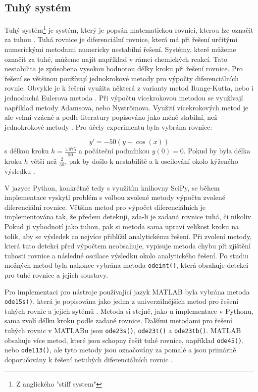 \subsection{Tuhý systém}
\label{tuhy}
Tuhý systém\footnote{Z anglického "stiff system"} je systém, který je popsán matematickou rovnicí, kterou lze označit za tuhou \cite{hairer}. Tuhá rovnice je diferenciální rovnice, která má při řešení určitými numerickými metodami numericky nestabilní řešení. Systémy, které můžeme označit za tuhé, můžeme najít například v rámci chemických reakcí. Tato nestabilita je způsobena vysokou hodnotou délky kroku při řešení rovnice. Pro řešení se většinou používají jednokrokové metody pro výpočty diferenciálních rovnic. Obvykle je k řešení využita některá z varianty metod Runge-Kutta, nebo i jednoduchá Eulerova metoda \cite{IMS-skripta}. Při výpočtu vícekrokovou metodou se využívají například metody Adamsova, nebo Nyströmova. Využití vícekrokových metod je ale velmi vzácné a podle literatury popisováno jako méně stabilní, než jednokrokové metody \cite{hairer}. Pro účely experimentu byla vybrána rovnice:

\begin{equation}
    y' = -50(y - \cos{(x)})
\end{equation}
s délkou kroku $h = \frac{1.875}{50}$ a počáteční podmínkou $y(0) = 0$. Pokud by byla délka kroku $h$ větší než $\frac{2}{50}$, pak by došlo k nestabilitě a k oscilování okolo kýženého výsledku \cite{hairer}.

V jazyce Python, konkrétně tedy s využitím knihovny SciPy, se během implementace vyskytl problém s volbou zvolené metody výpočtu zvolené diferenciální rovnice. Většina metod pro výpočet diferenciálních je implementována tak, že předem detekují, zda-li je zadaná rovnice tuhá, či nikoliv. Pokud ji vyhodnotí jako tuhou, pak si metoda sama upraví velikost kroku na tolik, aby se výsledek co nejvíce přiblížil analytickému řešení. Při zvolení metody, která tuto detekci před výpočtem neobsahuje, vypisuje metoda chybu při zjištění tuhosti rovnice a následné oscilace výsledku okolo analytického řešení. Po studiu možných metod byla nakonec vybrána metoda \texttt{odeint()}, která obsahuje detekci pro tuhé rovnice a jejich soustavy.


Pro implementaci pro nástroje používající jazyk MATLAB byla vybrána metoda \texttt{ode15s()}, která je popisována jako jedna z univerzálnějších metod pro řešení tuhých rovnic a jejich sytémů \cite{MATLAB:2010}. Metoda si stejně, jako u implementace v Pythonu, sama zvolí délku kroku podle zadané rovnice. Dalšími metodami pro řešení tuhých rovnic v MATLABu jsou \texttt{ode23s()}, \texttt{ode23t()} a \texttt{ode23tb()}. MATLAB obsahuje více metod, které jsou schopny řešit tuhé rovnice, například \texttt{ode45()}, nebo \texttt{ode113()}, ale tyto metody jsou označovány za pomalé a jsou primárně doporučovány k řešení netuhých diferenciálních rovnic \cite{MATLAB:2010}.

